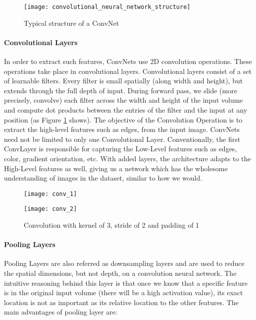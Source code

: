 \begin{figure}[h]
  \centering
  \texttt{[image: convolutional\_neural\_network\_structure]}
  \caption{Typical structure of a ConvNet}
\end{figure}
\paragraph{Convolutional Layers}
In order to extract such features, ConvNets use 2D convolution operations. These operations take place in convolutional layers. Convolutional
layers consist of a set of learnable filters. Every filter is small spatially (along width and height), but extends through the full depth of
input. During forward pass, we slide (more precisely, convolve) each filter across the width and height of the input volume and compute dot
products between the entries of the filter and the input at any position (as Figure \ref{fig:conv_example} shows). The objective of the
Convolution Operation is to extract the high-level features such as edges, from the input image. ConvNets need not be limited to only one
Convolutional Layer. Conventionally, the first ConvLayer is responsible for capturing the Low-Level features such as edges, color, gradient
orientation, etc. With added layers, the architecture adapts to the High-Level features as well, giving us a network which has the wholesome
understanding of images in the dataset, similar to how we would.

\begin{figure}[h]
  \centering
  \begin{minipage}[b]{0.4\textwidth}
    \texttt{[image: conv\_1]}
  \end{minipage}
  \hfill
  \begin{minipage}[b]{0.4\textwidth}
    \texttt{[image: conv\_2]}
  \end{minipage}
  \caption{Convolution with kernel of 3, stride of 2 and padding of 1}
  \label{fig:conv_example}
\end{figure}
\paragraph{Pooling Layers}
Pooling Layers are also referred as downsampling layers and are used to reduce the spatial dimensions, but not depth, on a convolution neural network.
The intuitive reasoning behind this layer is that once we know that a specific feature is in the original input volume (there will be a high activation value),
its exact location is not as important as its relative location to the other features. The main advantages of pooling layer are:

